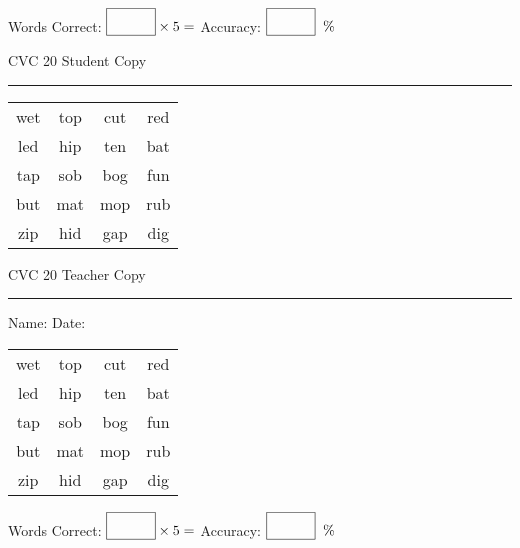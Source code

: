\documentclass{memoir}
\begin{document}
\small

Words Correct: $\fbox{\phantom{\huge 100}} \times 5 = $ Accuracy: $\fbox{\phantom{\huge 100}}\;\; \%$ 

\vfill

\newpage



\footnotesize \noindent
CVC 20 \hfill Student Copy
\smallskip
\hrule

\Large

\setlength{\tabcolsep}{14pt}
\def\arraystretch{2}

{\selectfont


\begin{vplace}[0.5]
\begin{center}
\begin{tabular}{cccc}
wet & top & cut & red \\
led & hip & ten & bat \\
tap & sob & bog & fun \\
but & mat & mop & rub \\
zip & hid & gap & dig \\
\end{tabular}
\end{center}
\end{vplace}

}

\newpage

\footnotesize \noindent
CVC 20 \hfill Teacher Copy
\smallskip
\hrule

\small

\vfill

\noindent
Name: \underline{\hspace{1.75in}} \hfill Date: \underline{\hspace{1in}}

\Large

{\selectfont


\begin{vplace}[0.5]
\begin{center}
\begin{tabular}{cccc}
wet & top & cut & red \\
led & hip & ten & bat \\
tap & sob & bog & fun \\
but & mat & mop & rub \\
zip & hid & gap & dig \\
\end{tabular}
\end{center}
\end{vplace}



}

\small

Words Correct: $\fbox{\phantom{\huge 100}} \times 5 = $ Accuracy: $\fbox{\phantom{\huge 100}}\;\; \%$ 

\vfill

\end{document}
